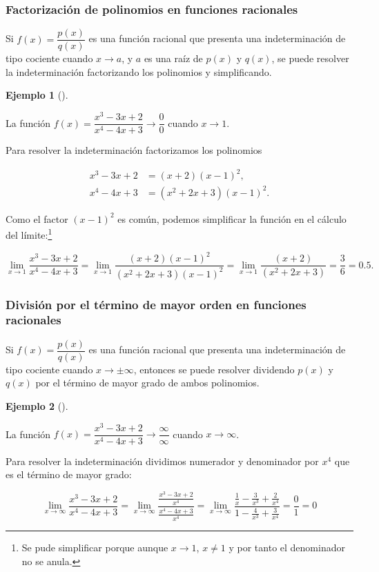 \documentclass[
  a4paper,
]{scrreport}
\theoremstyle{definition}
\newtheorem{example}{Ejemplo}[chapter]
\theoremstyle{plain}
\theoremstyle{definition}
\theoremstyle{definition}
\theoremstyle{plain}
\theoremstyle{plain}
\theoremstyle{remark}
\begin{document}
\subsubsection{Factorización de polinomios en funciones
racionales}\label{factorizaciuxf3n-de-polinomios-en-funciones-racionales}

Si \(f(x)=\dfrac{p(x)}{q(x)}\) es una función racional que presenta una
indeterminación de tipo cociente cuando \(x\to a\), y \(a\) es una raíz
de \(p(x)\) y \(q(x)\), se puede resolver la indeterminación
factorizando los polinomios y simplificando.

\begin{example}[]\protect\hypertarget{exm-solucion-indeterminacion-cociente}{}\label{exm-solucion-indeterminacion-cociente}

La función \(f(x)=\dfrac{x^3-3x+2}{x^4-4x+3}\to \dfrac{0}{0}\) cuando
\(x\to 1\).

Para resolver la indeterminación factorizamos los polinomios

\begin{align*}
x^3-3x+2 &= (x+2)(x-1)^2,\\
x^4-4x+3 &= (x^2+2x+3)(x-1)^2.
\end{align*}

Como el factor \((x-1)^2\) es común, podemos simplificar la función en
el cálculo del límite:\footnote{Se pude simplificar porque aunque
  \(x\to 1\), \(x\neq 1\) y por tanto el denominador no se anula.}

\[
\lim_{x\to 1}\frac{x^3-3x+2}{x^4-4x+3} = \lim_{x\to 1}\frac{(x+2)(x-1)^2}{(x^2+2x+3)(x-1)^2} = \lim_{x\to 1}\frac{(x+2)}{(x^2+2x+3)} =\frac{3}{6}=0.5.
\]

\end{example}

\subsubsection{División por el término de mayor orden en funciones
racionales}\label{divisiuxf3n-por-el-tuxe9rmino-de-mayor-orden-en-funciones-racionales}

Si \(f(x)=\dfrac{p(x)}{q(x)}\) es una función racional que presenta una
indeterminación de tipo cociente cuando \(x\to \pm\infty\), entonces se
puede resolver dividendo \(p(x)\) y \(q(x)\) por el término de mayor
grado de ambos polinomios.

\begin{example}[]\protect\hypertarget{exm-solucion-indeterminacion-cociente-2}{}\label{exm-solucion-indeterminacion-cociente-2}

La función \(f(x)=\dfrac{x^3-3x+2}{x^4-4x+3}\to \dfrac{\infty}{\infty}\)
cuando \(x\to \infty\).

Para resolver la indeterminación dividimos numerador y denominador por
\(x^4\) que es el término de mayor grado:

\[
\lim_{x\to \infty}\frac{x^3-3x+2}{x^4-4x+3} = \lim_{x\to \infty}\frac{\frac{x^3-3x+2}{x^4}}{\frac{x^4-4x+3}{x^4}} = \lim_{x\to \infty}\frac{\frac{1}{x}-\frac{3}{x^3}+\frac{2}{x^4}}{1-\frac{4}{x^3}+\frac{3}{x^4}} =\frac{0}{1}=0
\]

\end{example}
\end{document}
